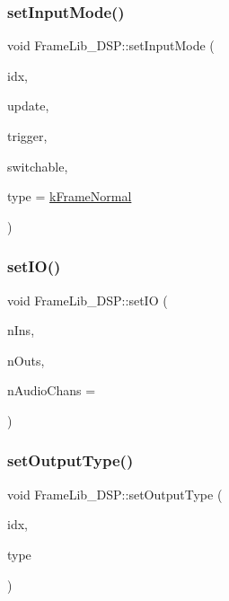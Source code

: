 \subsubsection{\texorpdfstring{set\+Input\+Mode()}{setInputMode()}}
{\footnotesize\ttfamily void Frame\+Lib\+\_\+\+D\+S\+P\+::set\+Input\+Mode (\begin{DoxyParamCaption}\item[{unsigned long}]{idx,  }\item[{bool}]{update,  }\item[{bool}]{trigger,  }\item[{bool}]{switchable,  }\item[{\hyperlink{_frame_lib___types_8h_ad495a9f61af7fff07d7e97979d1ab854}{Frame\+Type}}]{type = {\ttfamily \hyperlink{_frame_lib___types_8h_ad495a9f61af7fff07d7e97979d1ab854a4bc2388cbdd721f5039a32f95cd92b03}{k\+Frame\+Normal}} }\end{DoxyParamCaption})\hspace{0.3cm}{\ttfamily [protected]}}

\mbox{\label{class_frame_lib___d_s_p_a3d184baeb7b55fa099cb9c4a7393c70c}} 
\subsubsection{\texorpdfstring{set\+I\+O()}{setIO()}}
{\footnotesize\ttfamily void Frame\+Lib\+\_\+\+D\+S\+P\+::set\+IO (\begin{DoxyParamCaption}\item[{unsigned long}]{n\+Ins,  }\item[{unsigned long}]{n\+Outs,  }\item[{unsigned long}]{n\+Audio\+Chans = {} }\end{DoxyParamCaption})\hspace{0.3cm}{\ttfamily [protected]}}

\mbox{\label{class_frame_lib___d_s_p_a43da3ff5b57b3c1da655b0e6c7c0b37f}} 
\subsubsection{\texorpdfstring{set\+Output\+Type()}{setOutputType()}}
{\footnotesize\ttfamily void Frame\+Lib\+\_\+\+D\+S\+P\+::set\+Output\+Type (\begin{DoxyParamCaption}\item[{unsigned long}]{idx,  }\item[{\hyperlink{_frame_lib___types_8h_ad495a9f61af7fff07d7e97979d1ab854}{Frame\+Type}}]{type }\end{DoxyParamCaption})\hspace{0.3cm}{\ttfamily [protected]}}

